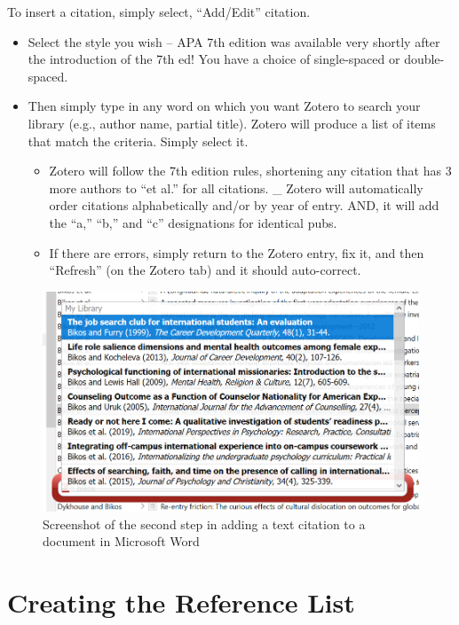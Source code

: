 \documentclass[
  english,
]{book}
\providecommand{\tightlist}{%
  \setlength{\itemsep}{0pt}\setlength{\parskip}{0pt}}
\begin{document}
To insert a citation, simply select, ``Add/Edit'' citation.

\begin{itemize}
\tightlist
\item
  Select the style you wish -- APA 7th edition was available very shortly after the introduction of the 7th ed! You have a choice of single-spaced or double-spaced.
\item
  Then simply type in any word on which you want Zotero to search your library (e.g., author name, partial title). Zotero will produce a list of items that match the criteria. Simply select it.

  \begin{itemize}
  \tightlist
  \item
    Zotero will follow the 7th edition rules, shortening any citation that has 3 more authors to ``et al.'' for all citations.
    \_ Zotero will automatically order citations alphabetically and/or by year of entry. AND, it will add the ``a,'' ``b,'' and ``c'' designations for identical pubs.
  \item
    If there are errors, simply return to the Zotero entry, fix it, and then ``Refresh'' (on the Zotero tab) and it should auto-correct.
  \end{itemize}
\end{itemize}

\begin{figure}
\centering
\includegraphics{images/Zotero/InsertingCitations2.png}
\caption{Screenshot of the second step in adding a text citation to a document in Microsoft Word}
\end{figure}

\hypertarget{creating-the-reference-list}{%
\section{Creating the Reference List}\label{creating-the-reference-list}}
\end{document}
